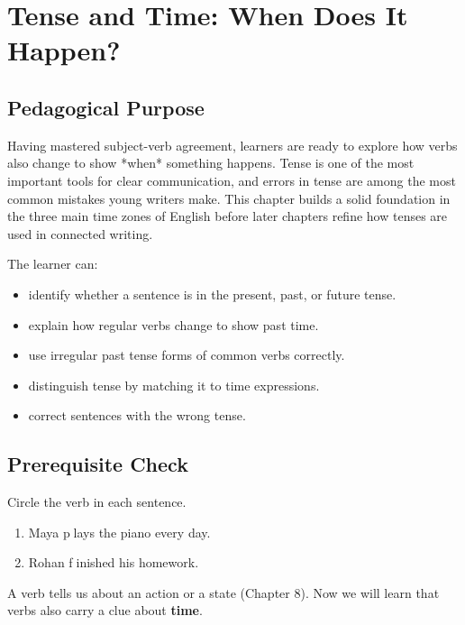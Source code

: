 
\chapter{Tense and Time: When Does It Happen?}

\section{Pedagogical Purpose}
Having mastered subject-verb agreement, learners are ready to explore how verbs also change to show *when* something happens. Tense is one of the most important tools for clear communication, and errors in tense are among the most common mistakes young writers make. This chapter builds a solid foundation in the three main time zones of English before later chapters refine how tenses are used in connected writing.

\begin{learningobjectives}
The learner can:
\begin{itemize}
    \item identify whether a sentence is in the present, past, or future tense.
    \item explain how regular verbs change to show past time.
    \item use irregular past tense forms of common verbs correctly.
    \item distinguish tense by matching it to time expressions.
    \item correct sentences with the wrong tense.
\end{itemize}
\end{learningobjectives}

\section{Prerequisite Check}
\begin{quickcheck}
Circle the verb in each sentence.
\begin{enumerate}
    \item Maya \textcircled{plays} the piano every day.
    \item Rohan \textcircled{finished} his homework.
\end{enumerate}
\end{quickcheck}

\begin{rememberbox}
A verb tells us about an action or a state (Chapter 8). Now we will learn that verbs also carry a clue about \textbf{time}.
\end{rememberbox}

